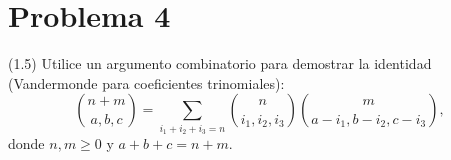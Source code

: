 
\section*{Problema 4}
(1.5) Utilice un argumento combinatorio para demostrar la identidad (Vandermonde para coeficientes trinomiales):
\[
  \binom{n+m}{a,b,c}
  = \sum_{i_1+i_2+i_3=n}
    \binom{n}{i_1,i_2,i_3}
    \binom{m}{a-i_1,b-i_2,c-i_3},
\]
donde $n,m\ge0$ y $a+b+c=n+m$.

